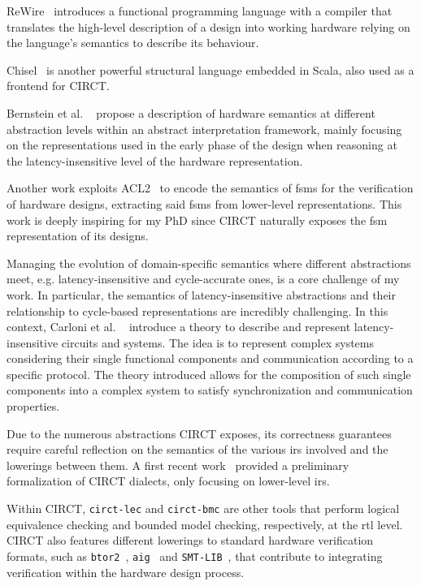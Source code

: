 \documentclass[sigconf,authorversion,nonacm, 11pt]{acmart}
\begin{document}
ReWire~\cite{procter2015semantics} introduces a functional programming language with a compiler that translates the high-level description of a design into working hardware relying on the language's semantics to describe its behaviour.

Chisel~\cite{bachrach2012chisel} is another powerful structural language embedded in Scala, also used as a frontend for CIRCT. 

Bernstein et al. ~\cite{bernstein2021semantics} propose a description of hardware semantics at different abstraction levels within an abstract interpretation framework, mainly focusing on the representations used in the early phase of the design when reasoning at the latency-insensitive level of the hardware representation.

Another work exploits ACL2~\cite{hunt2006sat} to encode the semantics of \acp{fsm} for the verification of hardware designs, extracting said \acp{fsm} from lower-level representations.
This work is deeply inspiring for my PhD since CIRCT naturally exposes the \ac{fsm} representation of its designs.

Managing the evolution of domain-specific semantics where different abstractions meet, e.g. latency-insensitive and cycle-accurate ones, is a core challenge of my work.
In particular, the semantics of latency-insensitive abstractions and their relationship to cycle-based representations are incredibly challenging. 
In this context, Carloni et al. ~\cite{carloni2001theory} introduce a theory to describe and represent latency-insensitive circuits and systems. 
The idea is to represent complex systems considering their single functional components and communication according to a specific protocol. 
The theory introduced allows for the composition of such single components into a complex system to satisfy synchronization and communication properties. 

Due to the numerous abstractions CIRCT exposes, its correctness guarantees require careful reflection on the semantics of the various \acp{ir} involved and the lowerings between them. 
A first recent work~\cite{zhao2024k} provided a preliminary formalization of CIRCT dialects, only focusing on lower-level \acp{ir}. 

Within CIRCT, \texttt{circt-lec} and \texttt{circt-bmc} are other tools that perform logical equivalence checking and bounded model checking, respectively, at the \ac{rtl} level. 
CIRCT also features different lowerings to standard hardware verification formats, such as \texttt{btor2}~\cite{btor2, niemetz2018btor2}, \texttt{aig}~\cite{aiger2} and \texttt{SMT-LIB}~\cite{barrett2010smt}, that contribute to integrating verification within the hardware design process.
\end{document}
